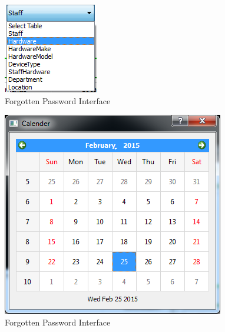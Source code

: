\begin{figure}[H]
    \includegraphics[width=\textwidth]{./Testing/Images/ComboBoxHardware.png}
    \caption{Forgotten Password Interface} \label{fig:ComboBoxHardware}
\end{figure}

\begin{figure}[H]
    \includegraphics[width=\textwidth]{./Testing/Images/Calendar.png}
    \caption{Forgotten Password Interface} \label{fig:Calendar}
\end{figure}

